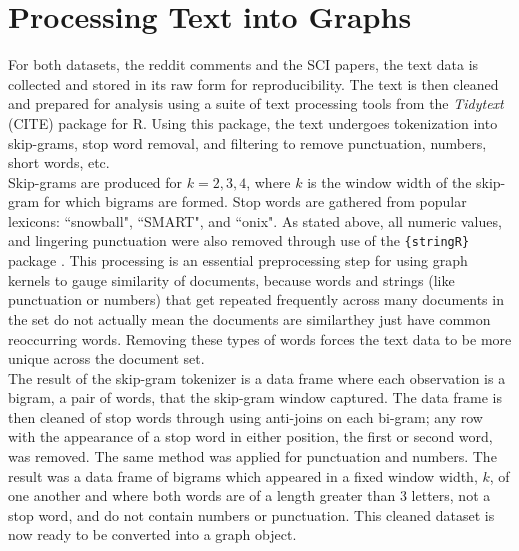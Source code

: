 %
%
%

\section{Processing Text into Graphs}

For both datasets, the reddit comments and the SCI papers, the text data is collected and stored in its raw form for reproducibility. The text is then cleaned and prepared for analysis using a suite of text processing tools from the \textit{Tidytext} (CITE) package for R. Using this package, the text undergoes tokenization into skip-grams, stop word removal, and filtering to remove punctuation, numbers, short words, etc. \\
Skip-grams are produced for $k=2,3,4$, where $k$ is the window width of the skip-gram for which bigrams are formed. Stop words are gathered from popular lexicons: ``snowball", ``SMART", and ``onix". As stated above, all numeric values, and lingering punctuation were also removed through use of the \texttt{\{stringR\}} package \cite{wickham2010stringr}. This processing is an essential preprocessing step for using graph kernels to gauge similarity of documents, because words and strings (like punctuation or numbers) that get repeated frequently across many documents in the set do not actually mean the documents are similar\textemdash they just have common reoccurring words. Removing these types of words forces the text data to be more unique across the document set.  \\
The result of the skip-gram tokenizer is a data frame where each observation is a bigram, a pair of words, that the skip-gram window captured. The data frame is then cleaned of stop words through using anti-joins on each bi-gram; any row with the appearance of a stop word in either position, the first or second word, was removed. The same method was applied for punctuation and numbers. The result was a data frame of bigrams which appeared in a fixed window width, $k$, of one another and where both words are of a length greater than 3 letters, not a stop word, and do not contain numbers or punctuation. This cleaned dataset is now ready to be converted into a graph object. \\
